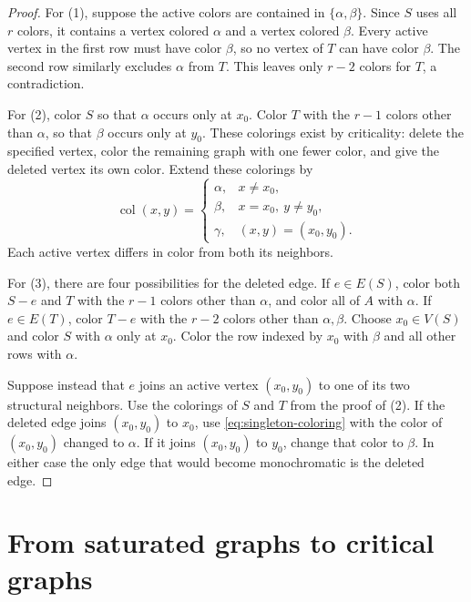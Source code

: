 \documentclass[11pt]{article}
\numberwithin{equation}{section}
\newcommand{\col}{\operatorname{col}}
\begin{document}
\begin{proof}
For (1), suppose the active colors are contained in
\(\{\alpha,\beta\}\). Since \(S\) uses all \(r\) colors, it
contains a vertex colored \(\alpha\) and a vertex colored
\(\beta\). Every active vertex in the first row must have color
\(\beta\), so no vertex of \(T\) can have color \(\beta\).
The second row similarly excludes \(\alpha\) from \(T\).
This leaves only \(r-2\) colors for \(T\), a contradiction.

For (2), color \(S\) so that \(\alpha\) occurs only at \(x_0\).
Color \(T\) with the \(r-1\) colors other than \(\alpha\), so that
\(\beta\) occurs only at \(y_0\). These colorings exist by criticality:
delete the specified vertex, color the remaining graph with one
fewer color, and give the deleted vertex its own color.
Extend these colorings by
\begin{equation}\label{eq:singleton-coloring}
 \col(x,y)=
 \begin{cases}
 \alpha,&x\ne x_0,\\
 \beta,&x=x_0,\ y\ne y_0,\\
 \gamma,&(x,y)=(x_0,y_0).
 \end{cases}
\end{equation}
Each active vertex differs in color from both its neighbors.

For (3), there are four possibilities for the deleted edge.
If \(e\in E(S)\), color both \(S-e\) and \(T\) with the \(r-1\)
colors other than \(\alpha\), and color all of \(A\) with
\(\alpha\). If \(e\in E(T)\), color \(T-e\) with the \(r-2\)
colors other than \(\alpha,\beta\). Choose \(x_0\in V(S)\)
and color \(S\) with \(\alpha\) only at \(x_0\). Color the
row indexed by \(x_0\) with \(\beta\) and all other rows with
\(\alpha\).

Suppose instead that \(e\) joins an active vertex
\((x_0,y_0)\) to one of its two structural neighbors.
Use the colorings of \(S\) and \(T\) from the proof of (2).
If the deleted edge joins \((x_0,y_0)\) to \(x_0\), use
\eqref{eq:singleton-coloring} with the color of \((x_0,y_0)\)
changed to \(\alpha\). If it joins \((x_0,y_0)\) to \(y_0\),
change that color to \(\beta\). In either case the only edge
that would become monochromatic is the deleted edge.
\end{proof}

\section{From saturated graphs to critical graphs}
\label{sec:conversion}
\end{document}
